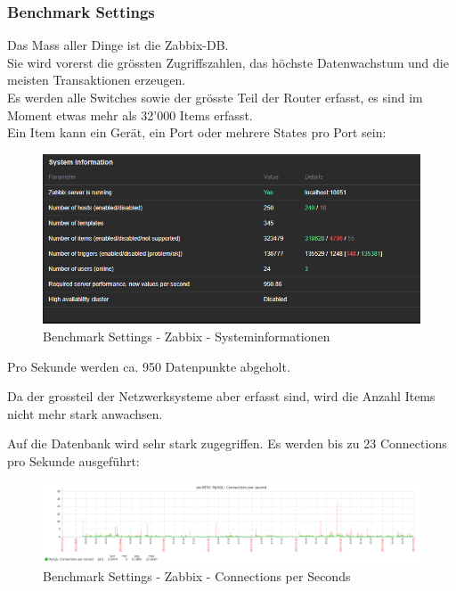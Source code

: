 
\begin{flushleft}
    \subsubsection{Benchmark Settings}
    \label{subsubsec:benchmark_settings}
    Das Mass aller Dinge ist die Zabbix-DB.\\
    Sie wird vorerst die grössten Zugriffszahlen, das höchste Datenwachstum und die meisten Transaktionen erzeugen.\\
    Es werden alle Switches sowie der grösste Teil der Router erfasst, es sind im Moment etwas mehr als 32'000 Items erfasst.\\
    Ein Item kann ein Gerät, ein Port oder mehrere States pro Port sein:
    \begin{figure}[H]
        \centering
        \includegraphics[width=0.8\linewidth]{source/implementation/evaluation/benchmarking/sks0970_zabbix_system_information}
        \caption{Benchmark Settings - Zabbix - Systeminformationen}
        \label{fig:sks0970_zabbix_system_information}
    \end{figure}
    Pro Sekunde werden ca.
    950 Datenpunkte abgeholt.
\end{flushleft}
\begin{flushleft}
    Da der grossteil der Netzwerksysteme aber erfasst sind, wird die Anzahl Items nicht mehr stark anwachsen.
\end{flushleft}
\begin{flushleft}
    Auf die Datenbank wird sehr stark zugegriffen.
    Es werden bis zu 23 Connections pro Sekunde ausgeführt:
    \begin{figure}[H]
        \centering
        \includegraphics[width=0.8\linewidth]{source/implementation/evaluation/benchmarking/sks0970_zabbix_mariadb_connections_per_second_graph}
        \caption{Benchmark Settings - Zabbix - Connections per Seconds}
        \label{fig:sks0970_zabbix_mariadb_connections_per_second_graph}
    \end{figure}
\end{flushleft}
